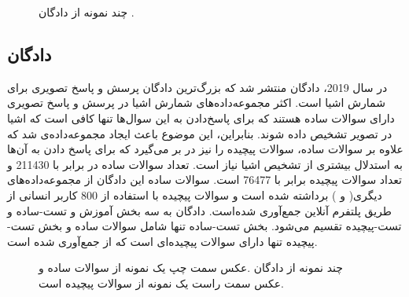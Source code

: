    \begin{figure}
   	\caption[چند نمونه از ‌دادگان]{چند نمونه از ‌دادگان \cite{johnson2017clevr}.}
   	\label{fig:CLEVRExample}
   \end{figure}

\subsection{ دادگان }

	در سال 2019، ‌دادگان 
   \cite{acharya2019tallyqa}
منتشر شد که بزرگ‌ترین ‌دادگان پرسش و پاسخ تصویری برای شمارش اشیا است. اکثر مجموعه‌داده‌های شمارش اشیا در پرسش و پاسخ تصویری دارای سوالات ساده هستند که برای پاسخ‌دادن به این سوال‌‌ها تنها کافی است که اشیا در تصویر تشخیص ‌داده ‌شوند. بنابراین، این موضوع باعث ایجاد مجموعه‌داده‌ی 
  شد که علاوه بر سوالات ساده، سوالات پیچیده را نیز در بر می‌گیرد که برای پاسخ دادن به آن‌ها به استدلال بیشتری از تشخیص اشیا نیاز است. تعداد سوالات ساده در
  برابر با 211430 و تعداد سوالات پیچیده برابر با 76477 است. سوالات ساده این ‌دادگان از مجموعه‌داده‌های دیگری( 
   \cite{goyal2017making}
  و 
   \cite{krishna2017visual}
  ) برداشته ‌شده ‌است و سوالات پیچیده با استفاده از 800 کاربر انسانی از طریق پلتفرم آنلاین 
  جمع‌آوری شده‌است. ‌دادگان 
  به سه بخش آموزش و تست-ساده و تست-پیچیده تقسیم می‌شود. بخش تست-ساده تنها شامل سوالات ساده و بخش تست-پیچیده تنها دارای سوالات پیچیده‌ای است که از 
  جمع‌آوری شده ‌است. 

   \begin{figure}
		\caption[چند نمونه از ‌دادگان]{چند نمونه از ‌دادگان  \cite{acharya2019tallyqa}.عکس سمت چپ یک نمونه از سوالات ساده و عکس سمت راست یک نمونه از سوالات پیچیده است.}
		\label{fig:TallyQAExample}
	\end{figure}

